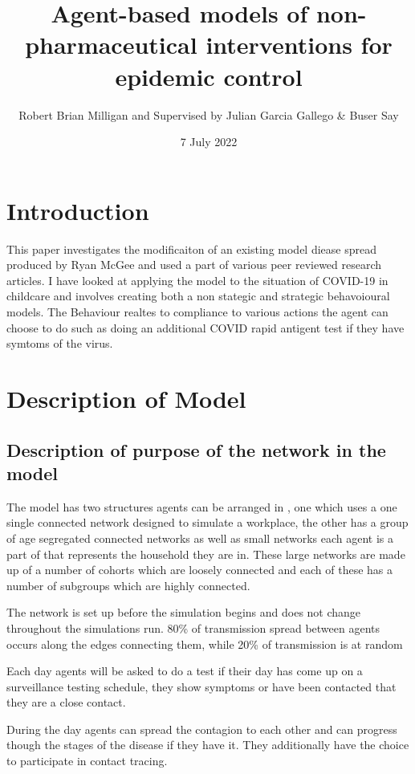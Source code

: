 \documentclass{article}
\title{Agent-based models of non-pharmaceutical interventions for epidemic control}
\author{Robert Brian Milligan and Supervised by Julian Garcia Gallego \& Buser Say}
\date{7 July 2022}
\begin{document}
\tableofcontents

\maketitle

\section{Introduction}
This paper investigates the modificaiton of an existing model diease spread produced by Ryan McGee and used a part of various peer reviewed research articles. I have looked at applying the model to the situation of COVID-19 in childcare and involves creating both a non stategic and strategic behavoioural models. The Behaviour realtes to compliance to various actions the agent can choose to do such as doing an additional COVID rapid antigent test if they have symtoms of the virus.

\section{Description of Model}
\subsection{Description of purpose of the network in the model}
The model has two structures agents can be arranged in , one which uses a one single connected network designed to simulate a workplace, the other has a group of age segregated connected networks as well as small networks each agent is a part of that represents the household they are in. These large networks are made up of a number of cohorts which are loosely connected and each of these has a number of subgroups which are highly connected.

The network is set up before the simulation begins and does not change throughout the simulations run. 80\% of transmission spread between agents occurs along the edges connecting them, while 20\% of transmission is at  random

Each day agents will be asked to do a test if their day has come up on a surveillance testing schedule, they show symptoms or have been contacted that they are a close contact.

During the day agents can spread the contagion to each other and can progress though the stages of the disease if they have it. They additionally have the choice to participate in contact tracing.
\end{document}

